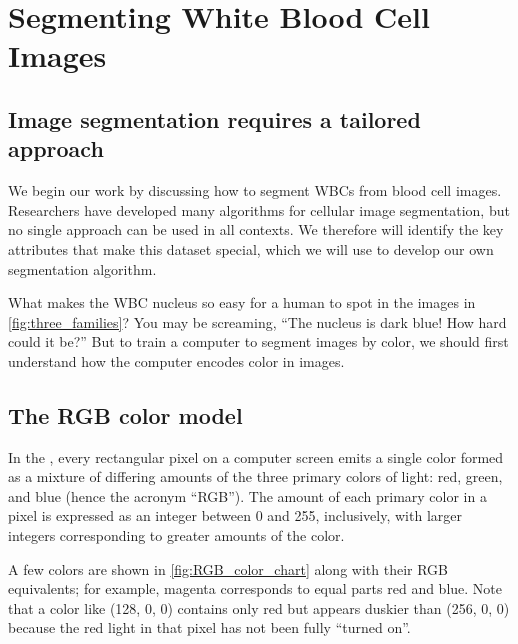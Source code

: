\FloatBarrier
{}

\section{Segmenting White Blood Cell Images}
\label{sec:segmenting_white_blood_cell_images}
\subsection{Image segmentation requires a tailored approach}

We begin our work by discussing how to segment WBCs from blood cell images. Researchers have developed many algorithms for cellular image segmentation, but no single approach can be used in all contexts. We therefore will identify the key attributes that make this dataset special, which we will use to develop our own segmentation algorithm.

What makes the WBC nucleus so easy for a human to spot in the images in \autoref{fig:three_families}? You may be screaming, ``The nucleus is dark blue! How hard could it be?'' But to train a computer to segment images by color, we should first understand how the computer encodes color in images.

\FloatBarrier
{}
\subsection{The RGB color model}

In the , every rectangular pixel on a computer screen emits a single color formed as a mixture of differing amounts of the three primary colors of light: red, green, and blue (hence the acronym ``RGB''). The amount of each primary color in a pixel is expressed as an integer between 0 and 255, inclusively, with larger integers corresponding to greater amounts of the color.

A few colors are shown in \autoref{fig:RGB_color_chart} along with their RGB equivalents; for example, magenta corresponds to equal parts red and blue. Note that a color like (128, 0, 0) contains only red but appears duskier than (256, 0, 0) because the red light in that pixel has not been fully “turned on”.\\

